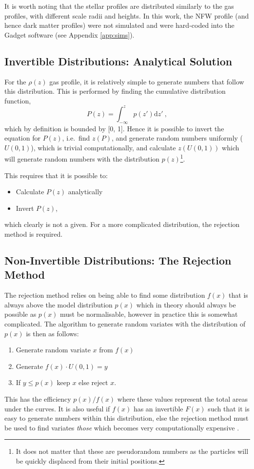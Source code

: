 It is worth noting that the stellar profiles are distributed similarly
to the gas profiles, with different scale radii and heights. In this work, the NFW profile (and hence dark matter profiles) were not simulated and were hard-coded into the Gadget software (see Appendix \ref{app:sims}).

\subsection{Invertible Distributions: Analytical
Solution}\label{easy-distributions---analytical-solution}

For the \(\rho(z)\) gas profile, it is relatively simple to generate
numbers that follow this distribution. This is performed by finding the
cumulative distribution function,
\[
    P(z) = \int_{-\infty}^z p(z') \mathrm{d}z'~,
\]
which by definition is bounded by {[}0, 1{]}. Hence it is possible to invert the
equation for \(P(z)\), i.e.~find \(z(P)\), and generate random numbers
uniformly (\(U(0, 1)\)), which is trivial computationally, and calculate
\(z(U(0, 1))\) which will generate random numbers with the distribution
\(p(z)\)\footnote{It does not matter that these are pseudorandom numbers as the particles will be quickly displaced from their initial positions.}.

This requires that it is possible to:
\begin{itemize}
\item
  Calculate \(P(z)\) analytically
\item
  Invert \(P(z)\),
\end{itemize}
which clearly is not a given. For a more complicated distribution, the
rejection method is required.

\subsection{Non-Invertible Distributions: The Rejection
Method}\label{hard-distributions---the-rejection-method}

The rejection method relies on being able to find some distribution
\(f(x)\) that is always above the model distribution \(p(x)\) which in theory
should always be possible as \(p(x)\) must be normalisable, however
in practice this is somewhat complicated. The algorithm to generate
random variates with the distribution of \(p(x)\) is then as follows:

\begin{enumerate}
\item
  Generate random variate \(x\) from \(f(x)\)
\item
  Generate \(f(x) \cdot U(0, 1) = y\)
\item
  If \(y \leq p(x)\) keep \(x\) else reject \(x\).
\end{enumerate}

This has the efficiency \(p(x)/f(x)\) where these values represent the
total areas under the curves. It is also useful if \(f(x)\) has an
invertible \(F(x)\) such that it is easy to generate numbers within this
distribution, else the rejection method must be used to find variates
\emph{those} which becomes very computationally expensive \citep{press_numerical_2007}.

